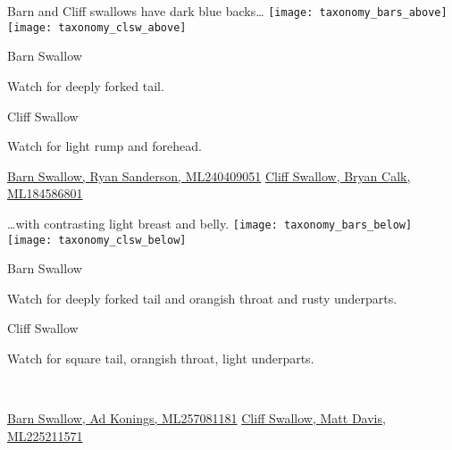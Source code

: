 \documentclass[t]{beamer}
\newcommand{\backoneline}{\vspace{-\baselineskip}}
\begin{document}
\begin{frame}{Barn and Cliff swallows have dark blue backs\dots}
	\texttt{[image: taxonomy\_bars\_above]}\hfill
	\texttt{[image: taxonomy\_clsw\_above]}
	
	\backoneline
	
	\begin{multicols}{2}
		Barn Swallow
		
		\medskip
		
		Watch for deeply forked tail.
		
		\medskip
		
		\columnbreak
		
		Cliff Swallow
		
		\medskip
		
		Watch for light rump and forehead.
	\end{multicols}	
	
	\vfilll
	
	\tiny
	
	\href{https://macaulaylibrary.org/asset/240409051}{Barn Swallow, Ryan Sanderson, ML240409051} \hfill 
	\href{https://macaulaylibrary.org/asset/184586801}{Cliff Swallow, Bryan Calk, ML184586801}
	
	
\end{frame}


%

\begin{frame}{\dots with contrasting light breast and belly.}
	\texttt{[image: taxonomy\_bars\_below]}\hfill
	\texttt{[image: taxonomy\_clsw\_below]}

	\backoneline
	
	\begin{multicols}{2}
		Barn Swallow
		
		\medskip
		
		Watch for deeply forked tail and orangish throat and rusty underparts.
		
		\columnbreak
		
		Cliff Swallow
		
		\medskip
		
		Watch for square tail, orangish throat, light underparts.
		
		\vfill\
		
	\end{multicols}	
	
	\vfilll
	
	\tiny
	
	\href{https://macaulaylibrary.org/asset/257081181}{Barn Swallow, Ad Konings, ML257081181} \hfill 
	\href{https://macaulaylibrary.org/asset/225211571}{Cliff Swallow, Matt Davis, ML225211571}


\end{frame}
\end{document}
